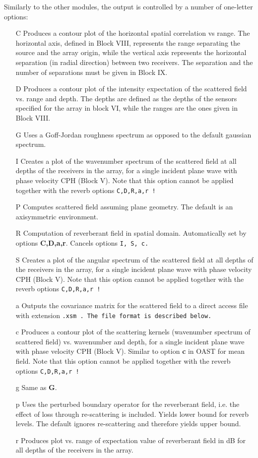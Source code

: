 Similarly to the other modules, the output is controlled by a number
of one-letter options:
\begin{itemize}
\item[C] Produces a contour plot of the horizontal spatial correlation
vs range. The horizontal axis, defined in Block VIII,  represents the
range separating the
source and the array origin, while the vertical axis represents the
horizontal separation (in radial direction) between two receivers. The
separation and the number of separations must be given in Block IX.
\item[D] Produces a contour plot of the intensity expectation of the
scattered field vs. range and depth. The depths are defined as the
depths of the sensors specified for the array in block VI, while the
ranges are the ones given in Block VIII.
\item[G] Uses a Goff-Jordan roughness spectrum as opposed to the
default gaussian spectrum.
\item[I] Creates a plot of the wavenumber spectrum of the scattered
field at all depths of the receivers in the array, for a single
incident plane wave with phase velocity CPH (Block V). Note that this
option cannot be applied together with the reverb options \tt C,D,R,a,r
\rm !  
\item[P] Computes scattered field assuming plane geometry. The default
is an axisymmetric environment.
\item[R] Computation of reverberant field in spatial domain.
Automatically set by options {\bf C,D,a,r}. Cancels options \tt I, S,
c.\rm
\item[S] Creates a plot of the angular spectrum of the scattered field
at all depths of the receivers in the array, for a single
incident plane wave with phase velocity CPH (Block V). Note that this
option cannot be applied together with the reverb options \tt C,D,R,a,r
\rm !  
\item[a] Outputs the covariance matrix for the scattered field 
 to a direct access
file with extension \tt .xsm \rm. The file format is described below.
\item[c] Produces a contour plot of the scattering kernels (wavenumber
spectrum of scattered field) vs. wavenumber and depth, for a single
incident plane wave with phase velocity CPH (Block V). Similar to
option {\bf c} in OAST for mean field.  Note that this
option cannot be applied together with the reverb options \tt C,D,R,a,r
\rm !  
\item[g] Same as {\bf G}.
\item[p] Uses the perturbed boundary operator for the reverberant
field, i.e. the effect of loss through re-scattering is included.
Yields lower bound for reverb levels. The default ignores
re-scattering and therefore yields upper bound.
\item[r] Produces plot vs. range of expectation value of reverberant
field in dB for all depths of the receivers in the array.
\end{itemize}

